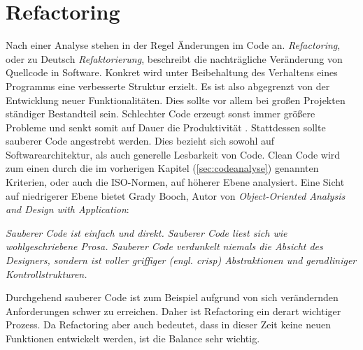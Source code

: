 \section{Refactoring}
\label{sec:refactor}
Nach einer Analyse stehen in der Regel Änderungen im Code an. \textit{Refactoring}, oder zu Deutsch \textit{Refaktorierung}, beschreibt die nachträgliche Veränderung von Quellcode in Software. Konkret wird unter Beibehaltung des Verhaltens eines Programms eine verbesserte Struktur erzielt. Es ist also abgegrenzt von der Entwicklung neuer Funktionalitäten. Dies sollte vor allem bei großen Projekten ständiger Bestandteil sein. Schlechter Code erzeugt sonst immer größere Probleme und senkt somit auf Dauer die Produktivität \cite[S. 28]{martin2009}. Stattdessen sollte sauberer Code angestrebt werden. Dies bezieht sich sowohl auf Softwarearchitektur, als auch generelle Lesbarkeit von Code. Clean Code wird zum einen durch die im vorherigen Kapitel (\autoref{sec:codeanalyse}) genannten Kriterien, oder auch die ISO-Normen, auf höherer Ebene analysiert. Eine Sicht auf niedrigerer Ebene bietet Grady Booch, Autor von \textit{Object-Oriented Analysis and Design with Application}:
\begin{center}
	\textit{Sauberer Code ist einfach und direkt. Sauberer Code liest sich wie wohlgeschriebene Prosa. Sauberer Code verdunkelt niemals die Absicht des Designers, sondern ist voller griffiger (engl. crisp) Abstraktionen und geradliniger Kontrollstrukturen.} \cite[S. 34]{martin2009}
\end{center}
Durchgehend sauberer Code ist zum Beispiel aufgrund von sich verändernden Anforderungen schwer zu erreichen. Daher ist Refactoring ein derart wichtiger Prozess. Da Refactoring aber auch bedeutet, dass in dieser Zeit keine neuen Funktionen entwickelt werden, ist die Balance sehr wichtig.

